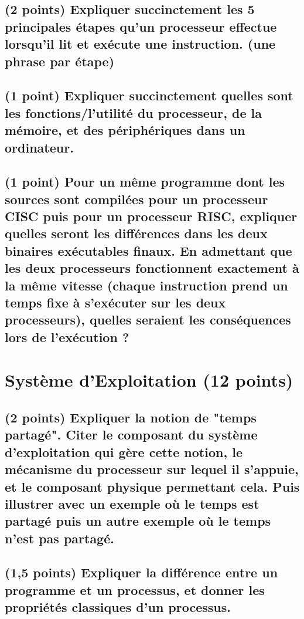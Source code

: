 \documentclass[11pt,a4paper]{article}
\begin{document}
\subsection{(2 points) Expliquer succinctement les 5 principales étapes qu'un processeur effectue lorsqu'il lit et exécute une instruction. (une phrase par étape)}

\bigskip

\subsection{(1 point) Expliquer succinctement quelles sont les fonctions/l'utilité du processeur, de la mémoire, et des périphériques dans un ordinateur.}

\bigskip

\subsection{(1 point) Pour un même programme dont les sources sont compilées pour un processeur CISC puis pour un processeur RISC, expliquer quelles seront les différences dans les deux binaires exécutables finaux. En admettant que les deux processeurs fonctionnent exactement à la même vitesse (chaque instruction prend un temps fixe à s'exécuter sur les deux processeurs), quelles seraient les conséquences lors de l'exécution ?}

\bigskip
\bigskip
\bigskip


\section{Système d'Exploitation (12 points)} %

\subsection{(2 points) Expliquer la notion de "temps partagé". Citer le composant du système d'exploitation qui gère cette notion, le mécanisme du processeur sur lequel il s'appuie, et le composant physique permettant cela. Puis illustrer avec un exemple où le temps est partagé puis un autre exemple où le temps n'est pas partagé.}

\bigskip

\subsection{(1,5 points) Expliquer la différence entre un programme et un processus, et donner les propriétés classiques d'un processus.}
\end{document}
